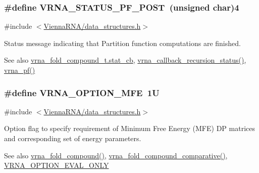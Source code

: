 \subsubsection[{\texorpdfstring{V\+R\+N\+A\+\_\+\+S\+T\+A\+T\+U\+S\+\_\+\+P\+F\+\_\+\+P\+O\+ST}{VRNA_STATUS_PF_POST}}]{\setlength{\rightskip}{0pt plus 5cm}\#define V\+R\+N\+A\+\_\+\+S\+T\+A\+T\+U\+S\+\_\+\+P\+F\+\_\+\+P\+O\+ST~(unsigned char)4}\hypertarget{group__fold__compound_ga1c6fa243533fd026e50f7d595eaaa565}{}\label{group__fold__compound_ga1c6fa243533fd026e50f7d595eaaa565}


{\ttfamily \#include $<$\hyperlink{data__structures_8h}{Vienna\+R\+N\+A/data\+\_\+structures.\+h}$>$}



Status message indicating that Partition function computations are finished. 

\begin{DoxySeeAlso}{See also}
\hyperlink{group__fold__compound_a87a83f6795b569000efcbe65acc3dd81}{vrna\+\_\+fold\+\_\+compound\+\_\+t.\+stat\+\_\+cb}, \hyperlink{group__fold__compound_ga4a4a0d838de6d18315bafc84f93f5cc0}{vrna\+\_\+callback\+\_\+recursion\+\_\+status()}, \hyperlink{group__pf__fold_ga29e256d688ad221b78d37f427e0e99bc}{vrna\+\_\+pf()} 
\end{DoxySeeAlso}
\subsubsection[{\texorpdfstring{V\+R\+N\+A\+\_\+\+O\+P\+T\+I\+O\+N\+\_\+\+M\+FE}{VRNA_OPTION_MFE}}]{\setlength{\rightskip}{0pt plus 5cm}\#define V\+R\+N\+A\+\_\+\+O\+P\+T\+I\+O\+N\+\_\+\+M\+FE~1U}\hypertarget{group__fold__compound_gae63be9127fe7dcc1f9bb14f5bb1064ee}{}\label{group__fold__compound_gae63be9127fe7dcc1f9bb14f5bb1064ee}


{\ttfamily \#include $<$\hyperlink{data__structures_8h}{Vienna\+R\+N\+A/data\+\_\+structures.\+h}$>$}



Option flag to specify requirement of Minimum Free Energy (M\+FE) DP matrices and corresponding set of energy parameters. 

\begin{DoxySeeAlso}{See also}
\hyperlink{group__fold__compound_ga6601d994ba32b11511b36f68b08403be}{vrna\+\_\+fold\+\_\+compound()}, \hyperlink{group__fold__compound_gad6bacc816af274922b13d947f708aa0c}{vrna\+\_\+fold\+\_\+compound\+\_\+comparative()}, \hyperlink{group__fold__compound_ga61469c423131552c8483229f8b6c7e0e}{V\+R\+N\+A\+\_\+\+O\+P\+T\+I\+O\+N\+\_\+\+E\+V\+A\+L\+\_\+\+O\+N\+LY} 
\end{DoxySeeAlso}
